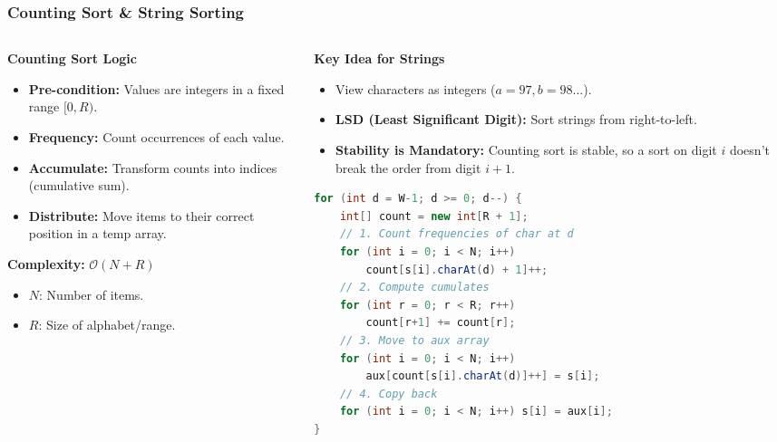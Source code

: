 \documentclass[8pt,aspectratio=169]{beamer}
\begin{document}
\begin{frame}[t, fragile]
\frametitle{Counting Sort \& String Sorting}

\begin{columns}[T]
    \begin{column}{0.48\textwidth}
        \textbf{Counting Sort Logic}
        \begin{itemize}
            \item \textbf{Pre-condition:} Values are integers in a fixed range $[0, R)$.
            \item \textbf{Frequency:} Count occurrences of each value.
            \item \textbf{Accumulate:} Transform counts into indices (cumulative sum).
            \item \textbf{Distribute:} Move items to their correct position in a temp array.
        \end{itemize}
        \textbf{Complexity:} $\mathcal{O}(N + R)$
        \begin{itemize}
            \item $N$: Number of items.
            \item $R$: Size of alphabet/range.
        \end{itemize}
    \end{column}

    \begin{column}{0.52\textwidth}
        \textbf{Key Idea for Strings}
        \begin{itemize}
            \item View characters as integers ($a=97, b=98 \dots$).
            \item \textbf{LSD (Least Significant Digit):} Sort strings from right-to-left. 
            \item \textbf{Stability is Mandatory:} Counting sort is stable, so a sort on digit $i$ doesn't break the order from digit $i+1$.
        \end{itemize}
\begin{lstlisting}[language=Java, basicstyle=\tiny\ttfamily, keywordstyle=\color{blue}, frame=single,title=LSD String Sort]
for (int d = W-1; d >= 0; d--) {
    int[] count = new int[R + 1];
    // 1. Count frequencies of char at d
    for (int i = 0; i < N; i++)
        count[s[i].charAt(d) + 1]++;
    // 2. Compute cumulates
    for (int r = 0; r < R; r++)
        count[r+1] += count[r];
    // 3. Move to aux array
    for (int i = 0; i < N; i++)
        aux[count[s[i].charAt(d)]++] = s[i];
    // 4. Copy back
    for (int i = 0; i < N; i++) s[i] = aux[i];
}
        \end{lstlisting}
    \end{column}
\end{columns}
\end{frame}
\end{document}
